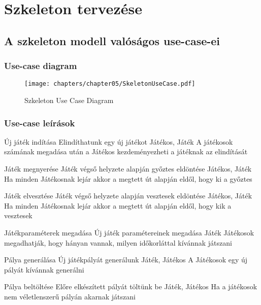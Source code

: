 %
\chapter{Szkeleton tervezése}

\thispagestyle{fancy}

\section{A szkeleton modell valóságos use-case-ei}


\subsection{Use-case diagram}

\begin{figure}[h]
\begin{center}
\texttt{[image: chapters/chapter05/SkeletonUseCase.pdf]}
\caption{Szkeleton Use Case Diagram}
\label{fig:SzkeletonUseCase}
\end{center}
\end{figure}

\subsection{Use-case leírások}

\usecase%
{Új játék indítása}%
{Elindíthatunk egy új játékot}%
{Játékos, Játék}%
{A játékosok számának megadása után a Játékos kezdeményezheti a játéknak az elindítását}

\usecase%
{Játék megnyerése}%
{Játék végső helyzete alapján győztes eldöntése}%
{Játékos, Játék}%
{Ha minden Játékosnak lejár akkor a megtett út alapján eldől, hogy ki a győztes}

\usecase%
{Játék elvesztése}%
{Játék végső helyzete alapján vesztesek eldöntése}%
{Játékos, Játék}%
{Ha minden Játékosnak lejár akkor a megtett út alapján eldől, hogy kik a vesztesek}

\usecase%
{Játékparaméterek megadása}%
{Új játék paramétereinek megadása}%
{Játék}%
{Játékosok megadhatják, hogy hányan vannak, milyen időkorláttal kívánnak játszani}

\usecase%
{Pálya generálása}%
{Új játékpályát generálunk}%
{Játék, Játékos}%
{A Játékosok egy új pályát kívánnak generálni}

\usecase%
{Pálya beltöltése}%
{Előre elkészített pályát töltünk be}%
{Játék, Játékos}%
{Ha a játékosok nem véletlenszerű pályán akarnak játszani}

